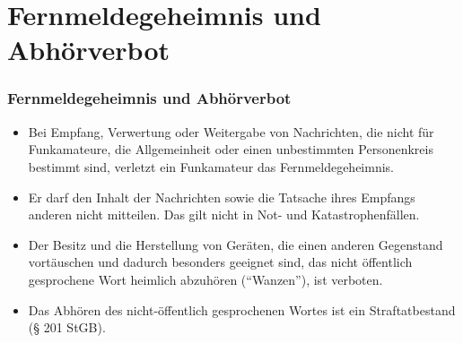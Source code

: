 \section{Fernmeldegeheimnis und Abhörverbot}
\label{section:fernmeldegeheimnis_abhoerverbot}
\begin{frame}%
    \frametitle{Fernmeldegeheimnis und Abhörverbot}
    \begin{itemize}
        \item Bei Empfang, Verwertung oder Weitergabe von Nachrichten, die nicht für Funkamateure, die Allgemeinheit oder einen unbestimmten Personenkreis bestimmt sind, verletzt ein Funkamateur das Fernmeldegeheimnis.
        \item Er darf den Inhalt der Nachrichten sowie die Tatsache ihres Empfangs anderen nicht mitteilen. Das gilt nicht in Not- und Katastrophenfällen.
        \item Der Besitz und die Herstellung von Geräten, die einen anderen Gegenstand vortäuschen und dadurch besonders geeignet sind, das nicht öffentlich gesprochene Wort heimlich abzuhören (\enquote{Wanzen}), ist verboten.
        \item Das Abhören des nicht-öffentlich gesprochenen Wortes ist ein Straftatbestand (§ 201 StGB).
    \end{itemize}
\end{frame}

